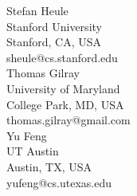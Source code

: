 \documentclass[a4paper,UKenglish]{dartsmaster}
\begin{document}
\begin{participants}
\participant	Stefan Heule	\\	Stanford University	\\	Stanford, CA, USA	\\	sheule@cs.stanford.edu	\\

\participant	Thomas Gilray	\\	University of Maryland	\\	College Park, MD, USA	\\	thomas.gilray@gmail.com	\\

\participant	Yu Feng	\\	UT Austin	\\	Austin, TX, USA	\\	yufeng@cs.utexas.edu	\\

\end{participants} 
\end{document}
